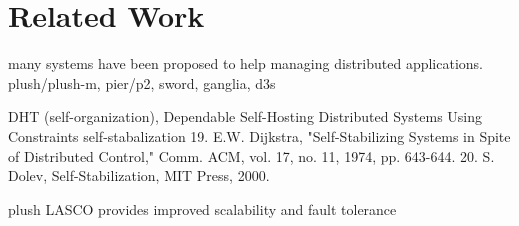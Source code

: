 \section{Related Work}
\label{sec:related}

many systems have been proposed to help managing distributed
applications.
plush/plush-m, pier/p2, sword, ganglia, d3s

DHT (self-organization), 
Dependable Self-Hosting Distributed Systems Using Constraints
self-stabalization
19. E.W. Dijkstra, "Self-Stabilizing Systems in Spite of Distributed Control," Comm.
ACM, vol. 17, no. 11, 1974, pp. 643-644.
20. S. Dolev, Self-Stabilization, MIT Press, 2000.



plush LASCO provides improved scalability and fault
tolerance

